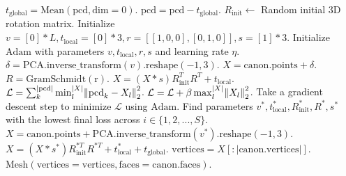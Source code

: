 \begin{algorithm}[H]
\begin{algorithmic}[1]
    \State $t_{\mathrm{global}} = \mathrm{Mean}(\mathrm{pcd}, \mathrm{dim}=0)$.
    \State $\mathrm{pcd} = \mathrm{pcd} - t_{\mathrm{global}}$. \Comment{\textcolor{blue}{Center the point cloud.}}
        \State $R_{\mathrm{init}} \leftarrow$ Random initial 3D rotation matrix.
        \State Initialize $v = [0]*L, t_{\mathrm{local}} = [0]*3, r = [[1, 0, 0], [0, 1, 0]], s = [1]*3$.
        \State Initialize $\mathrm{Adam}$ \cite{kingma17adam} with parameters $v, t_{\mathrm{local}}, r, s$ and learning rate $\eta$.
            \State $\delta = \mathrm{PCA.inverse\_transform}(v)\mathrm{.reshape(-1, 3)}$.
            \State $X = \mathrm{canon.points} + \delta$. \Comment{\textcolor{blue}{Warped canonical point cloud.}}
            \State $R = \mathrm{GramSchmidt(r)}$.
            \State $X = (X * s) R_{\mathrm{init}}^T R^T + t_{\mathrm{local}}$. \Comment{\textcolor{blue}{Scaled, rotated and translated point cloud.}}
            \State $\mathcal{L} = \sum_k^{|\mathrm{pcd}|} \min_l^{|X|} \norm{\mathrm{pcd}_k - X_l}_2^2$. \Comment{\textcolor{blue}{One-sided Chamfer distance.}}
            \State $\mathcal{L} = \mathcal{L} + \beta \max_l^{|X|} \norm{X_l}_2^2$. \Comment{\textcolor{blue}{Object size regularization.}}
            \State Take a gradient descent step to minimize $\mathcal{L}$ using $\mathrm{Adam}$.
        \EndFor
    \EndFor
    \State Find parameters $v^*, t^*_{\mathrm{local}}, R_{\mathrm{init}}^*, R^*, s^*$ with the lowest final loss across $i \in \{ 1, 2, ..., S \}$.
    \State $X = \mathrm{canon.points} +\mathrm{PCA.inverse\_transform}(v^*)\mathrm{.reshape(-1, 3)}$.
    \State $X = (X * s^*) R_{\mathrm{init}}^{*T} R^{*T} + t^*_{\mathrm{local}} + t_{\mathrm{global}}$. \Comment{\textcolor{blue}{Complete point cloud in workspace coordinates.}}
    \State $\mathrm{vertices} = X[:|\mathrm{canon.vertices}|]$. 
    \State \Return $\mathrm{Mesh}(\mathrm{vertices} = \mathrm{vertices}, \mathrm{faces} = \mathrm{canon.faces})$. \Comment{\textcolor{blue}{Warped mesh.}}

\end{algorithmic}

\end{algorithm}